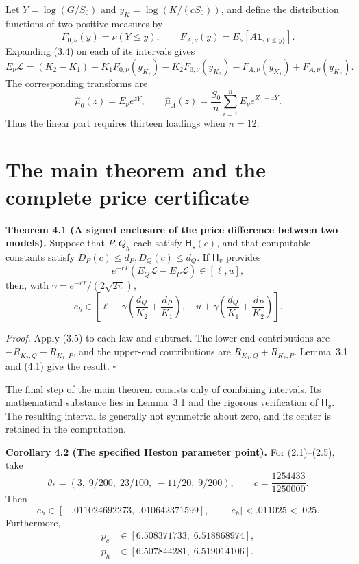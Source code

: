 \documentclass[11pt,a4paper]{article}
\begin{document}
Let \(Y=\log(G/S_0)\) and \(y_K=\log(K/(cS_0))\), and define the distribution functions of two positive measures by
\[
F_{0,\nu}(y)=\nu(Y\le y),\qquad
F_{A,\nu}(y)=E_\nu[A\mathbf1_{\{Y\le y\}}].
\]
Expanding (3.4) on each of its intervals gives
\[
E_\nu\mathcal L=(K_2-K_1)
+K_1F_{0,\nu}(y_{K_1})-K_2F_{0,\nu}(y_{K_2})
-F_{A,\nu}(y_{K_1})+F_{A,\nu}(y_{K_2}).
\tag{3.6}
\]
The corresponding transforms are
\[
\widehat\mu_0(z)=E_\nu e^{zY},\qquad
\widehat\mu_A(z)=\frac{S_0}{n}\sum_{i=1}^n
E_\nu e^{Z_{t_i}+zY}.
\tag{3.7}
\]
Thus the linear part requires thirteen loadings when \(n=12\).

\section{The main theorem and the complete price certificate}

\textbf{Theorem 4.1 (A signed enclosure of the price difference between two models).}
Suppose that \(P,Q_h\) each satisfy \(\mathsf H_s(c)\), and that computable constants satisfy
\(D_P(c)\le d_P,D_Q(c)\le d_Q\). If \(\mathsf H_v\) provides
\[
e^{-rT}(E_Q\mathcal L-E_P\mathcal L)\in[\ell,u],
\tag{4.1}
\]
then, with \(\gamma=e^{-rT}/(2\sqrt{2\pi})\),
\[
\boxed{
e_h\in
\left[
\ell-\gamma\!\left(\frac{d_Q}{K_2}+\frac{d_P}{K_1}\right),
\quad
u+\gamma\!\left(\frac{d_Q}{K_1}+\frac{d_P}{K_2}\right)
\right].}
\tag{4.2}
\]

\textit{Proof.} Apply (3.5) to each law and subtract. The lower-end contributions are
\(-R_{K_2,Q}-R_{K_1,P}\), and the upper-end contributions are
\(R_{K_1,Q}+R_{K_2,P}\). Lemma~3.1 and (4.1) give the result. \hfill\(\square\)

The final step of the main theorem consists only of combining intervals. Its mathematical substance lies in Lemma~3.1 and the rigorous verification of \(\mathsf H_v\). The resulting interval is generally not symmetric about zero, and its center is retained in the computation.


\textbf{Corollary 4.2 (The specified Heston parameter point).}
For (2.1)--(2.5), take
\[
\theta_*=(3,\;9/200,\;23/100,\;-11/20,\;9/200),\qquad
c=\frac{1254433}{1250000}.
\tag{4.3}
\]
Then
\[
e_h\in[-.011024692273,\;.010642371599],\qquad |e_h|<.011025<.025.
\tag{4.4}
\]
Furthermore,
\[
\begin{aligned}
p_c&\in[6.508371733,\;6.518868974],\\
p_h&\in[6.507844281,\;6.519014106].
\end{aligned}
\tag{4.5}
\]
\end{document}
